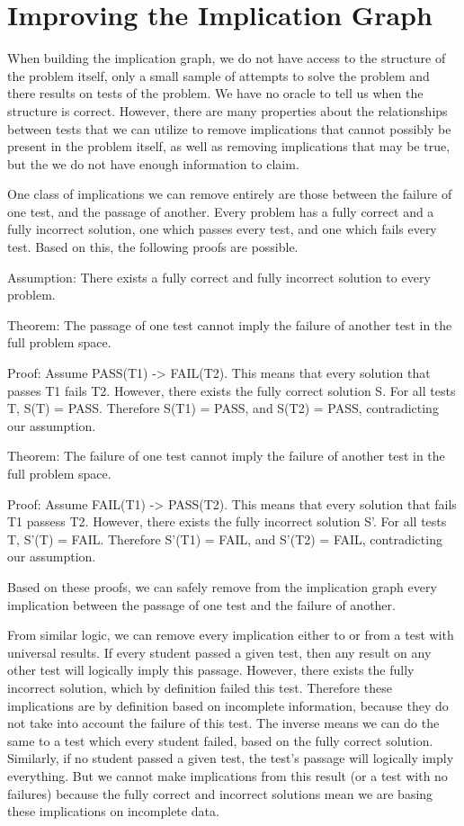 \documentclass[11pt]{article}
\begin{document}
\section{Improving the Implication Graph}



When building the implication graph, we do not have access to the structure of the problem itself, only a small sample of attempts to solve the problem and there results on tests of the problem. We have no oracle to tell us when the structure is correct. However, there are many properties about the relationships between tests that we can utilize to remove implications that cannot possibly be present in the problem itself, as well as removing implications that may be true, but the we do not have enough information  to claim.

One class of implications we can remove entirely are those between the failure of one test, and the passage of another. Every problem has a fully correct and a fully incorrect solution, one which passes every test, and one which fails every test. Based on this, the following proofs are possible.


Assumption: There exists a fully correct and fully incorrect solution to every problem.

Theorem: The passage of one test cannot imply the failure of another test in the full problem space.

Proof: Assume PASS(T1) -> FAIL(T2). This means that every solution that passes T1 fails T2. However, there exists the fully correct solution S. For all tests T, S(T) = PASS. Therefore S(T1) = PASS, and S(T2) = PASS, contradicting our assumption.

Theorem: The failure of one test cannot imply the failure of another test in the full problem space.

Proof: Assume FAIL(T1) -> PASS(T2). This means that every solution that fails T1 passess T2. However, there exists the fully incorrect solution S'. For all tests T, S'(T) = FAIL. Therefore S'(T1) = FAIL, and S'(T2) = FAIL, contradicting our assumption.


Based on these proofs, we can safely remove from the implication graph every implication between the passage of one test and the failure of another.

From similar logic, we can remove every implication either to or from a test with universal results. If every student passed a given test, then any result on any other test will logically imply this passage. However, there exists the fully incorrect solution, which by definition failed this test. Therefore these implications are by definition based on incomplete information, because they do not take into account the failure of this test. The inverse means we can do the same to a test which every student failed, based on the fully correct solution. Similarly, if no student passed a given test, the  test's passage will logically imply everything. But we cannot make implications  from this result (or a test with no failures) because the fully correct and incorrect solutions mean we are basing these implications on incomplete data.
\end{document}
